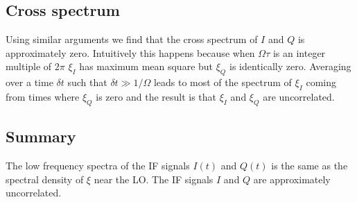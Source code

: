 \subsection{Cross spectrum}

Using similar arguments we find that the cross spectrum of $I$ and $Q$ is approximately zero.
Intuitively this happens because when $\Omega \tau$ is an integer multiple of $2\pi$ $\xi_I$ has maximum mean square but $\xi_Q$ is identically zero.
Averaging over a time $\delta t$ such that $\delta t \gg 1 / \Omega$ leads to most of the spectrum of $\xi_I$ coming from times where $\xi_Q$ is zero and the result is that $\xi_I$ and $\xi_Q$ are uncorrelated.

\subsection{Summary}

The low frequency spectra of the IF signals $I(t)$ and $Q(t)$ is the same as the spectral density of $\xi$ near the LO.
The IF signals $I$ and $Q$ are approximately uncorrelated.
